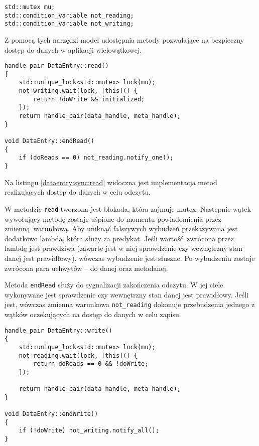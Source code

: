 \begin{minipage}{\textwidth}
	\begin{lstlisting}[label=dataentry:sync, caption={Składowe klasy \lstinline$DataEntry$ zapewniające bezpieczne użycie w środowisku wielowątkowym},alsoletter={()[].=}]
std::mutex mu;
std::condition_variable not_reading;
std::condition_variable not_writing;
	\end{lstlisting}
\end{minipage}

Z pomocą tych narzędzi model udostępnia metody pozwalające na bezpieczny dostęp do danych w aplikacji wielowątkowej.

\begin{minipage}{\textwidth}
	\begin{lstlisting}[label=dataentry:sync:read, caption={Metody klasy \lstinline$DataEntry$ zapewniające bezpieczny odczyt danych współdzielonych w środowisku wielowątkowym},alsoletter={()[].=}]
handle_pair DataEntry::read()
{
	std::unique_lock<std::mutex> lock(mu);
	not_writing.wait(lock, [this]() {
		return !doWrite && initialized;
	});
	return handle_pair(data_handle, meta_handle);
}

void DataEntry::endRead()
{
	if (doReads == 0) not_reading.notify_one();
}
	\end{lstlisting}
\end{minipage}

Na listingu \ref{dataentry:sync:read} widoczna jest implementacja metod realizujących dostęp do danych w celu odczytu. 

W metodzie \lstinline$read$ tworzona jest blokada, która zajmuje mutex. Następnie wątek wywołujący metodę zostaje uśpione do momentu powiadomienia przez zmienną warunkową. Aby uniknąć fałszywych wybudzeń przekazywana jest dodatkowo lambda, która służy za predykat. Jeśli wartość zwrócona przez lambdę jest prawdziwa (zawarte jest w niej sprawdzenie czy wewnętrzny stan danej jest prawidłowy), wówczas wybudzenie jest słuszne. Po wybudzeniu zostaje zwrócona para uchwytów -- do danej oraz metadanej.

Metoda \lstinline$endRead$ służy do sygnalizacji zakończenia odczytu. W jej ciele wykonywane jest sprawdzenie czy wewnętrzny stan danej jest prawidłowy. Jeśli jest, wówczas zmienna warunkowa \lstinline$not_reading$ dokonuje przebudzenia jednego z wątków oczekujących na dostęp do danych w celu zapisu.

\begin{minipage}{\textwidth}
	\begin{lstlisting}[label=dataentry:sync:write, caption={Metody klasy \lstinline$DataEntry$ zapewniające bezpieczny zapis danych współdzielonych w środowisku wielowątkowym},alsoletter={()[].=}]
handle_pair DataEntry::write()
{
	std::unique_lock<std::mutex> lock(mu);
	not_reading.wait(lock, [this]() {
		return doReads == 0 && !doWrite;
	});

	return handle_pair(data_handle, meta_handle);
}

void DataEntry::endWrite()
{
	if (!doWrite) not_writing.notify_all();
}
	\end{lstlisting}
\end{minipage}

